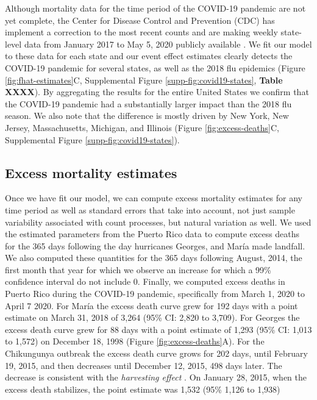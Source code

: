 \documentclass[11pt]{article}
\begin{document}
Although mortality data for the time period of the COVID-19 pandemic are not yet complete, the Center for Disease Control and Prevention (CDC) has implement a correction to the most recent counts and are making weekly state-level data from January 2017 to May 5, 2020 publicly available \cite{cdc2020covid19}. We fit our model to these data for each state and our event effect estimates clearly detects the COVID-19 pandemic for several states, as well as the 2018 flu epidemics (Figure \ref{fig:fhat-estimates}C, Supplemental Figure \ref{supp-fig:covid19-states}, \textbf{Table XXXX}). By aggregating the results for the entire United States we confirm that the COVID-19 pandemic had a substantially larger impact than the 2018 flu season. We also note that the difference is mostly driven by New York, New Jersey, Massachusetts, Michigan, and Illinois (Figure \ref{fig:excess-deaths}C, Supplemental Figure \ref{supp-fig:covid19-states}).

\subsection{Excess mortality estimates}
\label{subsec:excess-mortality}
Once we have fit our model, we can compute excess mortality estimates for any time period as well as standard errors that take into account, not just sample variability associated with count processes, but natural variation as well. We used the estimated parameters from the Puerto Rico data to compute excess deaths for the 365 days following the day hurricanes Georges, and Mar\'ia made landfall. We also computed these quantities for the 365 days following August, 2014, the first month that year for which we observe an increase for which a 99\% confidence interval do not include 0. Finally, we computed excess deaths in Puerto Rico during the COVID-19 pandemic, specifically from March 1, 2020 to April 7 2020. For Mar\'ia the excess death curve grew for 192 days with a point estimate on March 31, 2018 of 3,264 (95\% CI: 2,820 to 3,709). For Georges the excess death curve grew for 88 days with a point estimate of 1,293 (95\% CI: 1,013 to 1,572) on December 18, 1998 (Figure \ref{fig:excess-deaths}A). For the Chikungunya outbreak the excess death curve grows for 202 days, until February 19, 2015, and then decreases until December 12, 2015, 498 days later. The decrease is consistent with the \emph{harvesting effect} \cite{hajat2005mortality, dushoff2006mortality}. On January 28, 2015, when the excess death stabilizes, the point estimate was 1,532 (95\% 1,126 to 1,938)
\end{document}
